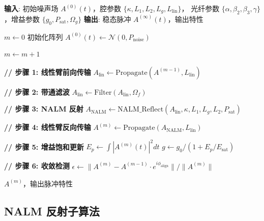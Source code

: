 \documentclass[11pt,a4paper]{ctexart}
\begin{document}
\begin{algorithm}[htbp]
\caption{九字腔锁模激光器稳态求解}
\label{alg:steady_state}
\begin{algorithmic}[1]
\State \textbf{输入}: 初始噪声场 $A^{(0)}(t)$，腔参数 $\{\kappa, L_1, L_2, L_g, L_{\text{lin}}\}$，
        光纤参数 $\{\alpha, \beta_2, \beta_3, \gamma\}$，增益参数 $\{g_0, P_{\text{sat}}, \Omega_g\}$
\State \textbf{输出}: 稳态脉冲 $A^{(\infty)}(t)$，输出特性

\State $m \gets 0$
\State 初始化阵列 $A^{(0)}(t) \gets \mathcal{N}(0, P_{\text{noise}})$ 

\Repeat
  \State $m \gets m + 1$

  \State \textbf{// 步骤 1: 线性臂前向传输}
  \State $A_{\text{lin}} \gets \text{Propagate}(A^{(m-1)}, L_{\text{lin}})$

  \State \textbf{// 步骤 2: 带通滤波}
  \State $A_{\text{lin}} \gets \text{Filter}(A_{\text{lin}}, \Omega_f)$

  \State \textbf{// 步骤 3: NALM 反射}
  \State $A_{\text{NALM}} \gets \text{NALM\_Reflect}(A_{\text{lin}}, \kappa, L_1, L_g, L_2, P_{\text{sat}})$

  \State \textbf{// 步骤 4: 线性臂反向传输}
  \State $A^{(m)} \gets \text{Propagate}(A_{\text{NALM}}, L_{\text{lin}})$

  \State \textbf{// 步骤 5: 增益饱和更新}
  \State $E_p \gets \int |A^{(m)}(t)|^2 dt$
  \State $g \gets g_0 / (1 + E_p / E_{\text{sat}})$

  \State \textbf{// 步骤 6: 收敛检测}
  \State $\epsilon \gets \|A^{(m)} - A^{(m-1)} \cdot e^{i\phi_{\text{align}}}\| / \|A^{(m)}\|$


\State \Return $A^{(m)}$，输出脉冲特性
\end{algorithmic}
\end{algorithm}

\subsection{NALM 反射子算法}
\end{document}
